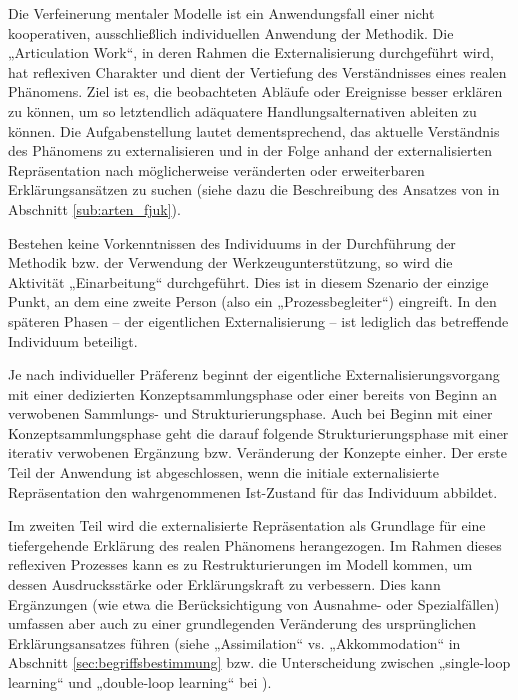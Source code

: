 Die Verfeinerung mentaler Modelle ist ein Anwendungsfall einer nicht kooperativen, ausschließlich individuellen Anwendung der Methodik. Die „Articulation Work“, in deren Rahmen die Externalisierung durchgeführt wird, hat reflexiven Charakter und dient der Vertiefung des Verständnisses eines realen Phänomens. Ziel ist es, die beobachteten Abläufe oder Ereignisse besser erklären zu können, um so letztendlich adäquatere Handlungsalternativen ableiten zu können. Die Aufgabenstellung lautet dementsprechend, das aktuelle Verständnis des Phänomens zu externalisieren und in der Folge anhand der externalisierten Repräsentation nach möglicherweise veränderten oder erweiterbaren Erklärungsansätzen zu suchen (siehe dazu die Beschreibung des Ansatzes von \citet{Fjuk97} in Abschnitt \ref{sub:arten_fjuk}).

Bestehen keine Vorkenntnissen des Individuums in der Durchführung der Methodik bzw. der Verwendung der Werkzeugunterstützung, so wird die Aktivität „Einarbeitung“ durchgeführt. Dies ist in diesem Szenario der einzige Punkt, an dem eine zweite Person (also ein „Prozessbegleiter“) eingreift. In den späteren Phasen -- der eigentlichen Externalisierung -- ist lediglich das betreffende Individuum beteiligt.

Je nach individueller Präferenz beginnt der eigentliche Externalisierungsvorgang mit einer dedizierten Konzeptsammlungsphase oder einer bereits von Beginn an verwobenen Sammlungs- und Strukturierungsphase. Auch bei Beginn mit einer Konzeptsammlungsphase geht die darauf folgende Strukturierungsphase mit einer iterativ verwobenen Ergänzung bzw. Veränderung der Konzepte einher. Der erste Teil der Anwendung ist abgeschlossen, wenn die initiale externalisierte Repräsentation den wahrgenommenen Ist-Zustand für das Individuum abbildet.

Im zweiten Teil wird die externalisierte Repräsentation als Grundlage für eine tiefergehende Erklärung des realen Phänomens herangezogen. Im Rahmen dieses reflexiven Prozesses kann es zu Restrukturierungen im Modell kommen, um dessen Ausdrucksstärke oder Erklärungskraft zu verbessern. Dies kann Ergänzungen (wie etwa die Berücksichtigung von Ausnahme- oder Spezialfällen) umfassen aber auch zu einer grundlegenden Veränderung des ursprünglichen Erklärungsansatzes führen (siehe „Assimilation“ vs. „Akkommodation“ in Abschnitt \ref{sec:begriffsbestimmung} bzw. die Unterscheidung zwischen „single-loop learning“ und „double-loop learning“ bei \citet{Argyris76}).

